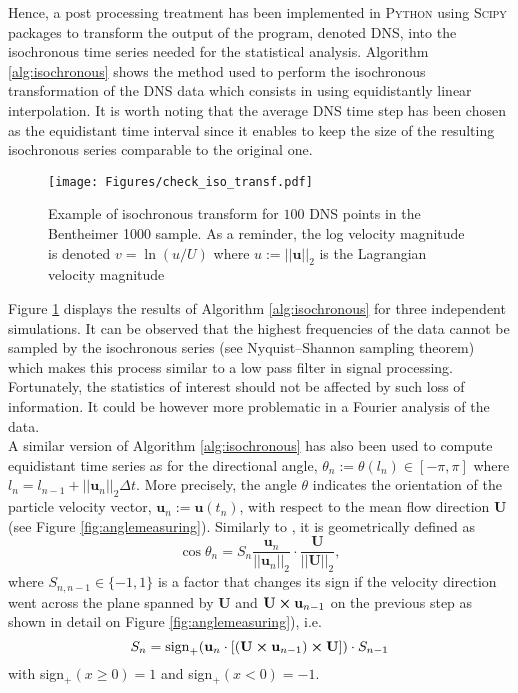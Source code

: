 Hence, a post processing treatment has been implemented in \textsc{Python} using \textsc{Scipy} packages to transform the output of the program, denoted DNS, into the isochronous time series needed for the statistical analysis.
Algorithm \ref{alg:isochronous} shows the method used to perform the isochronous transformation of the DNS data which consists in using equidistantly linear interpolation.
It is worth noting that the average DNS time step has been chosen as the equidistant time interval since it enables to keep the size of the resulting isochronous series comparable to the original one.\\
\begin{figure}
	\centering
	\texttt{[image: Figures/check\_iso\_transf.pdf]}
	\caption{Example of isochronous transform for $100$ DNS points in the Bentheimer 1000 sample. As a reminder, the log velocity magnitude is denoted $v=\ln{(u/U)}$ where $u:=||\textbf{u}||_2$ is the Lagrangian velocity magnitude}
	\label{fig:checkisotransf}
\end{figure}
Figure \ref{fig:checkisotransf} displays the results of Algorithm \ref{alg:isochronous} for three independent simulations.
It can be observed that the highest frequencies of the data cannot be sampled by the isochronous series (see Nyquist–Shannon sampling theorem) which makes this process similar to a low pass filter in signal processing.
Fortunately, the statistics of interest should not be affected by such loss of information. 
It could be however more problematic in a Fourier analysis of the data.\\

A similar version of Algorithm \ref{alg:isochronous} has also been used to compute equidistant time series as for the directional angle, $\theta_n:=\theta(l_n)\in[-\pi,\pi]$ where $l_n = l_{n-1} + ||\textbf{u}_n||_2 \Delta t$.
More precisely, the angle $\theta$ indicates the orientation of the particle velocity vector, $\textbf{u}_n :=\textbf{u}(t_n)$, with respect to the mean flow direction $\textbf{U}$ (see Figure \ref{fig:anglemeasuring}). 
Similarly to \citet{Meyer2016}, it is geometrically defined as
\begin{equation}
\cos \theta_n = S_{n} \frac{\textbf{u}_n}{||\textbf{u}_n||_2 }\cdot \frac{\textbf{U}}{||\textbf{U}||_2},
\end{equation}
where $S_{n,n-1}\in\{-1,1\}$ is a factor that changes its sign if the velocity direction went across the plane spanned by $\textbf{U}$ and $\textbf{U}\cross\textbf{u}_{n-1}$ on the previous step as shown in detail on Figure \ref{fig:anglemeasuring}), i.e.
\begin{equation}
S_{n} = \mathrm{sign}_+(\textbf{u}_n\cdot [(\textbf{U}\cross\textbf{u}_{n-1})\cross \textbf{U}])\cdot S_{n-1} 
\end{equation}
with sign$_+(x\geq 0)=1$ and sign$_+(x< 0)=-1$.

